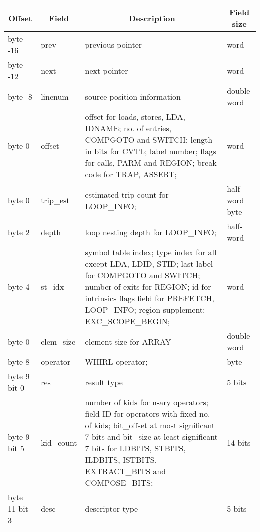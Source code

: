 \begin{table}[h]
\begin{center}
\begin{tabular}{|l|l|p{3in}|l|}\hline
\multicolumn{1}{|c|}{Offset} &
\multicolumn{1}{|c|}{Field} &
\multicolumn{1}{|c|}{Description} &
\multicolumn{1}{|c|}{Field size} \\\hline\hline
byte -16  & prev & previous pointer & word \\\hline
byte -12 & next & next pointer & word \\\hline
byte -8 & linenum & source position information & double word \\\hline
byte 0  & offset & 
offset for loads, stores,
\index{LDA}%
LDA,
\index{IDNAME}%
IDNAME;
no. of entries,
\index{COMPGOTO}%
COMPGOTO and
\index{SWITCH}%
SWITCH;
length in bits for
\index{CVTL}%
CVTL;
label number;
flags for calls,
\index{PARM}%
PARM and
\index{REGION}%
REGION;
break code for
\index{TRAP}%
TRAP,
\index{ASSERT}%
ASSERT; & word\\\hline
%
byte 0 & trip\_est & estimated trip count for 
\index{LOOP\_INFO}%
LOOP\_INFO; & half-word byte\\\hline
%
byte 2  & depth & loop nesting depth for LOOP\_INFO; & half-word \\\hline
byte 4 & st\_idx & symbol table index; 
type index for all except
\index{LDA}%
LDA,
\index{LDID}%
LDID,
\index{STID}%
STID;
last label for
\index{COMPGOTO}%
COMPGOTO and
\index{SWITCH}%
SWITCH;
number of exits for
\index{REGION}%
REGION;
id for intrinsics
flags field for
\index{PREFETCH}%
PREFETCH, 
\index{LOOP\_INFO}%
LOOP\_INFO;
region supplement: EXC\_SCOPE\_BEGIN;
& word \\\hline
%
byte 0 & elem\_size & element size for
\index{ARRAY}%
ARRAY & double word \\\hline\hline
%
byte 8 & operator & WHIRL operator;  & byte \\\hline 
%
byte 9 bit 0 & res & result type& 5 bits\\\hline 
%
byte 9 bit 5  & kid\_count  & number of kids for n-ary operators; field ID for
operators with fixed no. of kids;
bit\_offset at most significant 7 bits and bit\_size at least significant
7 bits for
\index{LDBITS}%
LDBITS,
\index{STBITS}%
STBITS,
\index{ILDBITS}%
ILDBITS,
\index{ISTBITS}%
ISTBITS, 
\index{EXTRACT\_BITS}%
EXTRACT\_BITS and
\index{COMPOSE\_BITS}%
COMPOSE\_BITS; & 14 bits\\\hline
%
byte 11 bit 3 & desc  & descriptor type & 5 bits \\\hline

\end{tabular}
\end{center}
\end{table}
